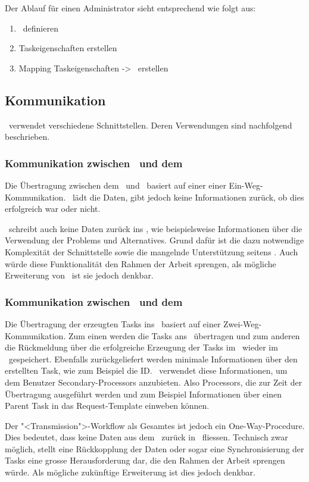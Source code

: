 		Der Ablauf für einen Administrator sieht entsprechend wie folgt aus:
		\begin{enumerate}
			\item \ppt\ definieren
			\item Taskeigenschaften erstellen
			\item Mapping Taskeigenschaften -> \ppt\ erstellen
		\end{enumerate}					
				
		
		\subsection{Kommunikation}
		\eeppi\ verwendet verschiedene Schnittstellen. Deren Verwendungen sind nachfolgend beschrieben.
			\subsubsection{Kommunikation zwischen \eeppi\ und dem \dks}
				Die Übertragung zwischen dem \dks\ und \eeppi\ basiert auf einer einer Ein-Weg-Kommunikation.
				\eeppi\ lädt die Daten, gibt jedoch keine Informationen zurück, ob dies erfolgreich war oder nicht.
				
				\eeppi\ schreibt auch keine Daten zurück ins \dks, wie beispielsweise Informationen über die Verwendung der Problems und Alternatives.
				Grund dafür ist die dazu notwendige Komplexität der Schnittstelle sowie die mangelnde Unterstützung seitens \dks.
				Auch würde diese Funktionalität den Rahmen der Arbeit sprengen, als mögliche Erweiterung von \eeppi\ ist sie jedoch denkbar.
				
			
			\subsubsection{Kommunikation zwischen \eeppi\ und dem \ppt}
				Die Übertragung der erzeugten Tasks ins \ppt\ basiert auf einer Zwei-Weg-Kommunikation.
				Zum einen werden die Tasks ans \ppt\ übertragen
				und zum anderen die Rückmeldung über die erfolgreiche Erzeugung der Tasks im \ppt\ wieder im \eeppi\ gespeichert.
				Ebenfalls zurückgeliefert werden minimale Informationen über den erstellten Task, 
				wie zum Beispiel die ID. 
				\eeppi\ verwendet diese Informationen, um dem Benutzer Secondary-Processors anzubieten.
				Also Processors, die zur Zeit der Übertragung ausgeführt werden und zum Beispiel Informationen über einen Parent Task in das Request-Template einweben können.
				
				Der "<Transmission">-Workflow als Gesamtes ist jedoch ein One-Way-Procedure.
				Dies bedeutet, dass keine Daten aus dem \ppt\ zurück in \eeppi\ fliessen.
				Technisch zwar möglich, stellt eine Rückkopplung der Daten oder sogar eine Synchronisierung der Tasks eine grosse Herausforderung dar, 
				die den Rahmen der Arbeit sprengen würde.
				Als mögliche zukünftige Erweiterung ist dies jedoch denkbar.